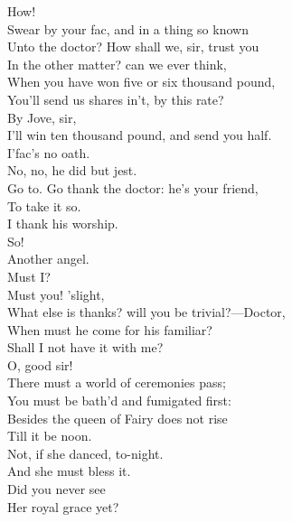 \documentclass[a4paper,oneside]{memoir}
\begin{document}
\begin{drama*}
\facespeaks {} How!\\
Swear by your fac, and in a thing so known\\
Unto the doctor? How shall we, sir, trust you\\
In the other matter? can we ever think,\\
When you have won five or six thousand pound,\\
You'll send us shares in't, by this rate?\\
\dapperspeaks {} By Jove, sir,\\
I'll win ten thousand pound, and send you half.\\
I'fac's no oath.\\
\subtlespeaks {} No, no, he did but jest.\\
\facespeaks Go to. Go thank the doctor: he's your friend,\\
To take it so.\\
\dapperspeaks {} I thank his worship.\\
\facespeaks {} So!\\
Another angel.\\
\dapperspeaks {} Must I?\\
\facespeaks {} Must you! 'slight,\\
What else is thanks? will you be trivial?---Doctor,\\
When must he come for his familiar?\\
\dapperspeaks Shall I not have it with me?\\
\subtlespeaks {} O, good sir!\\
There must a world of ceremonies pass;\\
You must be bath'd and fumigated first:\\
Besides the queen of Fairy does not rise\\
Till it be noon.\\
\facespeaks {} Not, if she danced, to-night.\\
\subtlespeaks And she must bless it.\\
\facespeaks {} Did you never see\\
Her royal grace yet?\\

\end{drama*}
\end{document}

